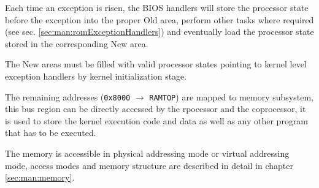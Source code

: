 Each time an exception is risen, the BIOS handlers will store the processor state before the exception into the proper Old area, perform other tasks where required (see sec. \ref{sec:man:romExceptionHandlers}) and eventually load the processor state stored in the corresponding New area.

The New areas must be filled with valid processor states pointing to kernel level exception handlers by kernel initialization stage.


The remaining addresses (\texttt{0x8000} $\rightarrow$ \texttt{RAMTOP}) are mapped to memory subsystem, this bus region can be directly accessed by the rpocessor and the coprocessor, it is used to store the kernel execution code and data as well as any other program that has to be executed.

The memory is accessible in physical addressing mode or virtual addressing mode, access modes and memory structure are described in detail in chapter \ref{sec:man:memory}.
